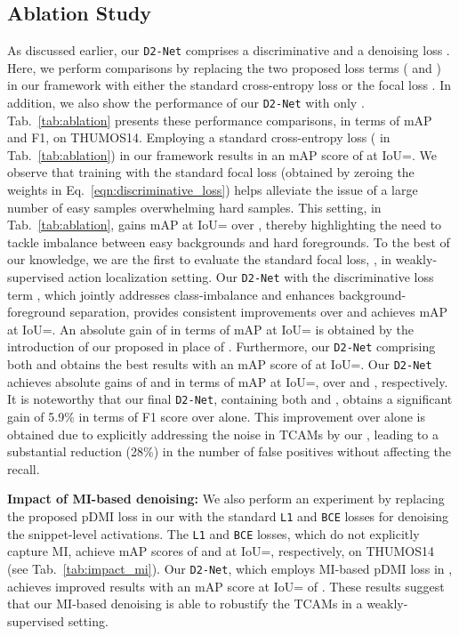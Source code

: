 \documentclass[10pt,twocolumn,letterpaper]{article}
\def\proposed{\texttt{D2-Net}{}}
\begin{document}
\subsection{Ablation Study\label{sec:ablation}}
As discussed earlier, our \proposed{} comprises a discriminative  and a denoising loss . Here, we perform comparisons by replacing the two proposed loss terms ( and ) in our framework with either the standard cross-entropy loss  or the focal loss . In addition, we also show the performance of our \proposed{} with only . Tab.~\ref{tab:ablation} presents these performance comparisons, in terms of mAP and F1, on THUMOS14. Employing a standard cross-entropy loss ( in Tab.~\ref{tab:ablation}) in our framework results in an mAP score of  at IoU=. We observe that training with the standard focal loss (obtained by zeroing the weights  in Eq.~\ref{eqn:discriminative_loss}) helps alleviate the issue of a large number of easy samples overwhelming hard samples. This setting,  in Tab.~\ref{tab:ablation}, gains  mAP at IoU= over , thereby  highlighting the need to tackle imbalance between easy backgrounds and hard foregrounds. To the best of our knowledge, we are the first to evaluate the standard focal loss, , in weakly-supervised action localization setting.
Our \proposed{} with the discriminative loss term , which jointly addresses class-imbalance and enhances background-foreground separation, provides consistent improvements over  and achieves  mAP at IoU=. An absolute gain of  in terms of mAP at IoU= is obtained by the introduction of our proposed  in place of . Furthermore, our \proposed{} comprising both  and  obtains the best results with an mAP score of  at IoU=. Our  \proposed{} achieves absolute gains of  and  in terms of mAP at IoU=, over  and , respectively. It is noteworthy that our final \proposed{}, containing both   and , obtains a significant gain of 5.9\% in terms of F1 score over  alone. 
This improvement over  alone is obtained due to explicitly addressing the noise in TCAMs by our , leading to a substantial reduction (28\%) in the number of false positives without affecting the recall.

\noindent\textbf{Impact of MI-based denoising:} We also perform an experiment by replacing the proposed pDMI loss in our  with the standard \texttt{L1} and \texttt{BCE} losses for denoising the snippet-level activations.  The \texttt{L1} and \texttt{BCE} losses, which do not explicitly capture MI, achieve mAP scores of  and  at IoU=, respectively, on THUMOS14 (see Tab.~\ref{tab:impact_mi}). Our \proposed{}, which employs MI-based pDMI loss in , achieves improved results with an mAP score at IoU= of . These results suggest that our MI-based denoising is able to robustify the TCAMs in a weakly-supervised setting. 
\end{document}

